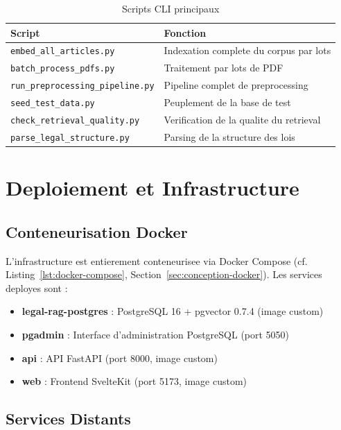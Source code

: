 \begin{table}[h]
\centering
\renewcommand{\arraystretch}{1.3}
\begin{tabular}{|l|p{7cm}|}
\hline
\rowcolor{LightBlue}
\textbf{\color{PrimaryBlue}Script} & \textbf{\color{PrimaryBlue}Fonction} \\
\hline
\texttt{embed\_all\_articles.py} & Indexation complete du corpus par lots \\
\texttt{batch\_process\_pdfs.py} & Traitement par lots de PDF \\
\texttt{run\_preprocessing\_pipeline.py} & Pipeline complet de preprocessing \\
\texttt{seed\_test\_data.py} & Peuplement de la base de test \\
\texttt{check\_retrieval\_quality.py} & Verification de la qualite du retrieval \\
\texttt{parse\_legal\_structure.py} & Parsing de la structure des lois \\
\hline
\end{tabular}
\caption{Scripts CLI principaux}
\label{tab:cli-scripts}
\end{table}

\section{Deploiement et Infrastructure}

\subsection{Conteneurisation Docker}

L'infrastructure est entierement conteneurisee via Docker Compose (cf. Listing~\ref{lst:docker-compose}, Section~\ref{sec:conception-docker}). Les services deployes sont :

\begin{itemize}
    \item \textbf{legal-rag-postgres} : PostgreSQL 16 + pgvector 0.7.4 (image custom)
    \item \textbf{pgadmin} : Interface d'administration PostgreSQL (port 5050)
    \item \textbf{api} : API FastAPI (port 8000, image custom)
    \item \textbf{web} : Frontend SvelteKit (port 5173, image custom)
\end{itemize}

\subsection{Services Distants}

